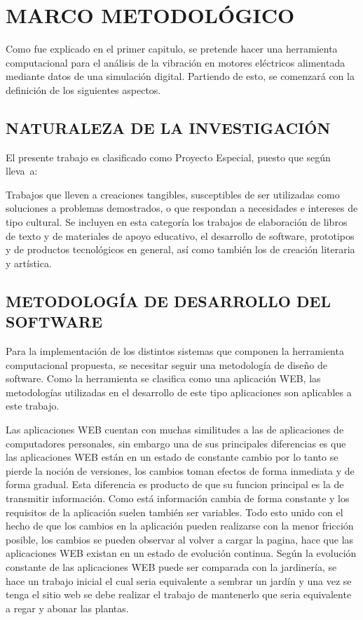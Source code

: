 \thispagestyle{empty}

\section{MARCO METODOLÓGICO}

Como fue explicado en el primer capitulo, se pretende hacer una herramienta
computacional para el análisis de la vibración en motores eléctricos alimentada
mediante datos de una simulación digital. Partiendo de esto, se comenzará
con la definición de los siguientes aspectos.

\subsection{NATURALEZA DE LA INVESTIGACIÓN}

El presente trabajo es clasificado como Proyecto Especial, puesto que según
\textcite{Hernandez} lleva~a:

\begin{center}
    \parbox[ht]{13.5 cm}{Trabajos que lleven a creaciones tangibles,
    susceptibles de ser utilizadas como soluciones a problemas demostrados, o
    que respondan a necesidades e intereses de tipo cultural. Se incluyen en
    esta categoría los trabajos de elaboración de libros de texto y de
    materiales de apoyo educativo, el desarrollo de software, prototipos y de
    productos tecnológicos en general, así como también los de creación
    literaria y artística.}
\end{center}

\subsection*{METODOLOGÍA DE DESARROLLO DEL SOFTWARE}

Para la implementación de los distintos sistemas que componen la herramienta
computacional propuesta, se necesitar seguir una metodología de diseño de
software. Como la herramienta se clasifica como una aplicación WEB, las
metodologías utilizadas en el desarrollo de este tipo aplicaciones son
aplicables a este trabajo.

Las aplicaciones WEB cuentan con muchas similitudes a las de aplicaciones de
computadores personales, sin embargo una de sus principales diferencias es que
las aplicaciones WEB están en un estado de constante cambio por lo tanto
se pierde la noción de versiones, los cambios toman efectos de forma inmediata
y de forma gradual. Esta diferencia es producto de que su funcion principal es
la de transmitir información. Como está información cambia de forma constante y
los requisitos de la aplicación suelen también ser variables. Todo esto unido
con el hecho de que los cambios en la aplicación pueden realizarse con la
menor fricción posible, los cambios se pueden observar al volver a cargar la
pagina, hace que las aplicaciones WEB existan en un estado de evolución
continua. Según \cite{pressman2002} la evolución constante de las aplicaciones
WEB puede ser comparada con la jardinería, se hace un trabajo inicial el cual
seria equivalente a sembrar un jardín y una vez se tenga el sitio web se debe
realizar el trabajo de mantenerlo que seria equivalente a regar y abonar las
plantas.

